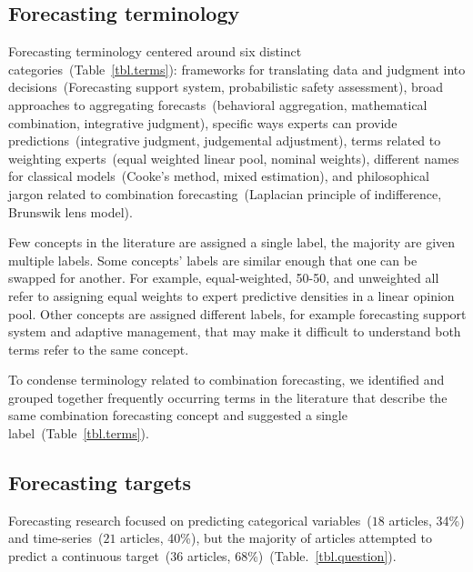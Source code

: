 \documentclass[preprint,authoryear]{elsarticle}
\begin{document}
\subsection{Forecasting terminology}

Forecasting terminology centered around six distinct categories~(Table~\ref{tbl.terms}): frameworks for translating data and judgment into decisions~(Forecasting support system, probabilistic safety assessment), broad approaches to aggregating forecasts~(behavioral aggregation, mathematical combination, integrative judgment), specific ways experts can provide predictions~(integrative judgment, judgemental adjustment), terms related to weighting experts~(equal weighted linear pool, nominal weights), different names for classical models~(Cooke's method, mixed estimation), and philosophical jargon related to combination forecasting~(Laplacian principle of indifference, Brunswik lens model). 

Few concepts in the literature are assigned a single label, the majority are given multiple labels.
Some concepts' labels are similar enough that one can be swapped for another.
For example, equal-weighted, 50-50, and unweighted all refer to assigning equal weights to expert predictive densities in a linear opinion pool. 
Other concepts are assigned different labels, for example forecasting support system and adaptive management, that may make it difficult to understand both terms refer to the same concept.

To condense terminology related to combination forecasting, we identified and grouped together frequently occurring terms in the literature that describe the same combination forecasting concept and suggested a single label~(Table~\ref{tbl.terms}).

\subsection{Forecasting targets}

Forecasting research focused on predicting categorical variables~($18$ articles, 34\%) and time-series~($21$ articles, 40\%), but
the majority of articles attempted to predict a continuous target~($36$ articles, $68$\%)~(Table.~\ref{tbl.question}).
\end{document}
